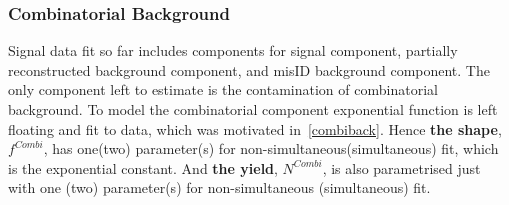 \subsubsection{Combinatorial Background}
Signal data fit so far includes components for signal component, partially reconstructed background component, and misID background component. The only component left to estimate is the contamination of combinatorial background. To model the combinatorial component exponential function is left floating and fit to data, which was motivated in~\autoref{combiback}. Hence \textbf{the shape}, $f^{Combi}$, has one(two) parameter(s) for non-simultaneous(simultaneous) fit, which is the exponential constant. And \textbf{the yield}, $N^{Combi}$, is also parametrised just with one (two) parameter(s) for non-simultaneous (simultaneous) fit.

